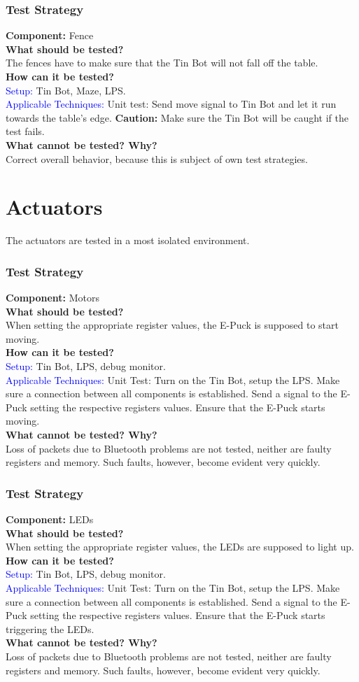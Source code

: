 \documentclass[a4paper,parskip,headheight=38pt]{scrartcl} %
\newcommand{\teststrat}[5]{
    \subsubsection{Test Strategy}
	\textbf{Component:} #1 \\
	\noindent\textbf{What should be tested?} \\
    \noindent #2 \\
	\noindent\textbf{How can it be tested?} \\
    \noindent\textcolor{blue}{Setup:} #3 \\
    \noindent\textcolor{blue}{Applicable Techniques:} #4 \\
	\noindent\textbf{What cannot be tested? Why?} \\
    \noindent #5
}
\begin{document}
\teststrat{Fence}{
    The fences have to make sure that the Tin Bot will not fall off the table.
}{
    Tin Bot, Maze, LPS.
}{
    Unit test: Send move signal to Tin Bot and let it run towards the table's
    edge. \textbf{Caution:} Make sure the Tin Bot will be caught if the test
    fails.
}{
    Correct overall behavior, because this is subject of own test strategies.
}

\section{Actuators}

The actuators are tested in a most isolated environment.

\teststrat{Motors}{
    When setting the appropriate register values, the E-Puck is supposed to
    start moving.
}{
    Tin Bot, LPS, debug monitor.
}{
    Unit Test: Turn on the Tin Bot, setup the LPS. Make sure a connection
    between all components is established. Send a signal to the E-Puck setting
    the respective registers values. Ensure that the E-Puck starts moving.
}{
    Loss of packets due to Bluetooth problems are not tested, neither are faulty
    registers and memory. Such faults, however, become evident very quickly.
}

\teststrat{LEDs}{
    When setting the appropriate register values, the LEDs are supposed to
    light up.
}{
    Tin Bot, LPS, debug monitor.
}{
    Unit Test: Turn on the Tin Bot, setup the LPS. Make sure a connection
    between all components is established. Send a signal to the E-Puck setting
    the respective registers values. Ensure that the E-Puck starts triggering
    the LEDs.
}{
    Loss of packets due to Bluetooth problems are not tested, neither are faulty
    registers and memory. Such faults, however, become evident very quickly.
}
\end{document}
